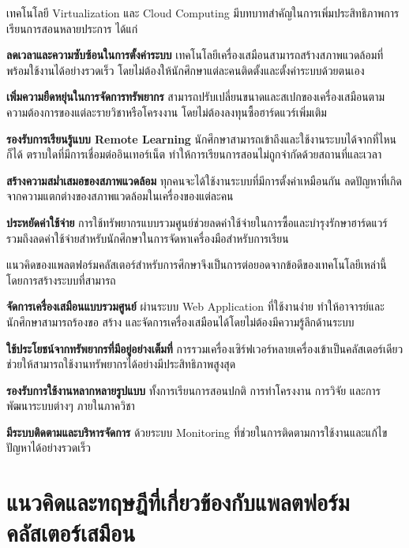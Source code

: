\hspace*{1.5em} %
เทคโนโลยี Virtualization และ Cloud Computing มีบทบาทสำคัญในการเพิ่มประสิทธิภาพการเรียนการสอนหลายประการ ได้แก่
\begin{mycustomitem}
    \item \textbf{ลดเวลาและความซับซ้อนในการตั้งค่าระบบ} เทคโนโลยีเครื่องเสมือนสามารถสร้างสภาพแวดล้อมที่พร้อมใช้งานได้อย่างรวดเร็ว โดยไม่ต้องให้นักศึกษาแต่ละคนติดตั้งและตั้งค่าระบบด้วยตนเอง
    \item \textbf{เพิ่มความยืดหยุ่นในการจัดการทรัพยากร} สามารถปรับเปลี่ยนขนาดและสเปกของเครื่องเสมือนตามความต้องการของแต่ละรายวิชาหรือโครงงาน โดยไม่ต้องลงทุนซื้อฮาร์ดแวร์เพิ่มเติม
    \item \textbf{รองรับการเรียนรู้แบบ Remote Learning} นักศึกษาสามารถเข้าถึงและใช้งานระบบได้จากที่ไหนก็ได้ ตราบใดที่มีการเชื่อมต่ออินเทอร์เน็ต ทำให้การเรียนการสอนไม่ถูกจำกัดด้วยสถานที่และเวลา
    \item \textbf{สร้างความสม่ำเสมอของสภาพแวดล้อม} ทุกคนจะได้ใช้งานระบบที่มีการตั้งค่าเหมือนกัน ลดปัญหาที่เกิดจากความแตกต่างของสภาพแวดล้อมในเครื่องของแต่ละคน
    \item \textbf{ประหยัดค่าใช้จ่าย} การใช้ทรัพยากรแบบรวมศูนย์ช่วยลดค่าใช้จ่ายในการซื้อและบำรุงรักษาฮาร์ดแวร์ รวมถึงลดค่าใช้จ่ายสำหรับนักศึกษาในการจัดหาเครื่องมือสำหรับการเรียน
\end{mycustomitem}

\hspace*{1.5em} %
แนวคิดของแพลตฟอร์มคลัสเตอร์สำหรับการศึกษาจึงเป็นการต่อยอดจากข้อดีของเทคโนโลยีเหล่านี้ โดยการสร้างระบบที่สามารถ
\begin{mycustomitem}
    \item \textbf{จัดการเครื่องเสมือนแบบรวมศูนย์} ผ่านระบบ Web Application ที่ใช้งานง่าย ทำให้อาจารย์และนักศึกษาสามารถร้องขอ สร้าง และจัดการเครื่องเสมือนได้โดยไม่ต้องมีความรู้ลึกด้านระบบ
    \item \textbf{ใช้ประโยชน์จากทรัพยากรที่มีอยู่อย่างเต็มที่} การรวมเครื่องเซิร์ฟเวอร์หลายเครื่องเข้าเป็นคลัสเตอร์เดียว ช่วยให้สามารถใช้งานทรัพยากรได้อย่างมีประสิทธิภาพสูงสุด
    \item \textbf{รองรับการใช้งานหลากหลายรูปแบบ} ทั้งการเรียนการสอนปกติ การทำโครงงาน การวิจัย และการพัฒนาระบบต่างๆ ภายในภาควิชา
    \item \textbf{มีระบบติดตามและบริหารจัดการ} ด้วยระบบ Monitoring ที่ช่วยในการติดตามการใช้งานและแก้ไขปัญหาได้อย่างรวดเร็ว
\end{mycustomitem}



\section{แนวคิดและทฤษฎีที่เกี่ยวข้องกับแพลตฟอร์มคลัสเตอร์เสมือน}

